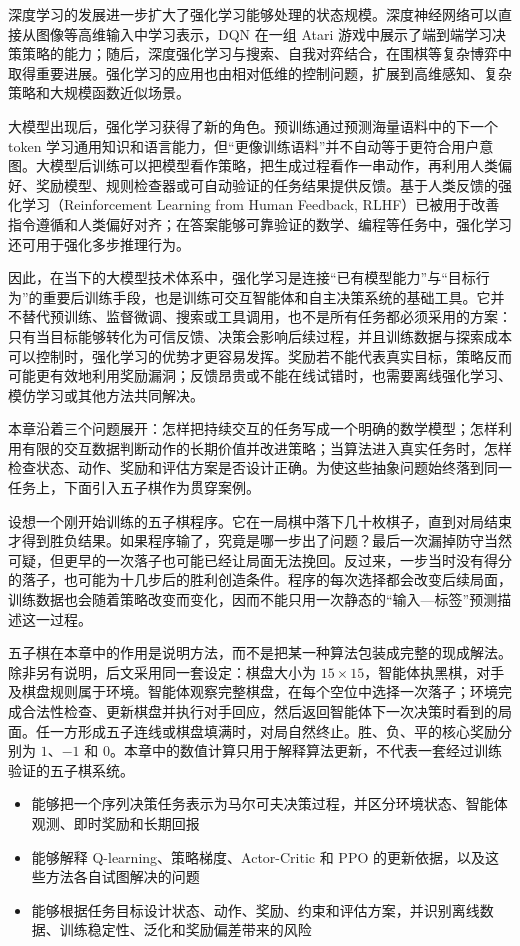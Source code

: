 \documentclass[UTF8,a4paper,zihao=-4,oneside,openany]{ctexbook}
\begin{document}
深度学习的发展进一步扩大了强化学习能够处理的状态规模。深度神经网络可以直接从图像等高维输入中学习表示，DQN 在一组 Atari 游戏中展示了端到端学习决策策略的能力；随后，深度强化学习与搜索、自我对弈结合，在围棋等复杂博弈中取得重要进展。强化学习的应用也由相对低维的控制问题，扩展到高维感知、复杂策略和大规模函数近似场景。

大模型出现后，强化学习获得了新的角色。预训练通过预测海量语料中的下一个 token 学习通用知识和语言能力，但“更像训练语料”并不自动等于更符合用户意图。大模型后训练可以把模型看作策略，把生成过程看作一串动作，再利用人类偏好、奖励模型、规则检查器或可自动验证的任务结果提供反馈。基于人类反馈的强化学习（Reinforcement Learning from Human Feedback, RLHF）已被用于改善指令遵循和人类偏好对齐；在答案能够可靠验证的数学、编程等任务中，强化学习还可用于强化多步推理行为。

因此，在当下的大模型技术体系中，强化学习是连接“已有模型能力”与“目标行为”的重要后训练手段，也是训练可交互智能体和自主决策系统的基础工具。它并不替代预训练、监督微调、搜索或工具调用，也不是所有任务都必须采用的方案：只有当目标能够转化为可信反馈、决策会影响后续过程，并且训练数据与探索成本可以控制时，强化学习的优势才更容易发挥。奖励若不能代表真实目标，策略反而可能更有效地利用奖励漏洞；反馈昂贵或不能在线试错时，也需要离线强化学习、模仿学习或其他方法共同解决。

本章沿着三个问题展开：怎样把持续交互的任务写成一个明确的数学模型；怎样利用有限的交互数据判断动作的长期价值并改进策略；当算法进入真实任务时，怎样检查状态、动作、奖励和评估方案是否设计正确。为使这些抽象问题始终落到同一任务上，下面引入五子棋作为贯穿案例。

设想一个刚开始训练的五子棋程序。它在一局棋中落下几十枚棋子，直到对局结束才得到胜负结果。如果程序输了，究竟是哪一步出了问题？最后一次漏掉防守当然可疑，但更早的一次落子也可能已经让局面无法挽回。反过来，一步当时没有得分的落子，也可能为十几步后的胜利创造条件。程序的每次选择都会改变后续局面，训练数据也会随着策略改变而变化，因而不能只用一次静态的“输入—标签”预测描述这一过程。

五子棋在本章中的作用是说明方法，而不是把某一种算法包装成完整的现成解法。除非另有说明，后文采用同一套设定：棋盘大小为 $15\times15$，智能体执黑棋，对手及棋盘规则属于环境。智能体观察完整棋盘，在每个空位中选择一次落子；环境完成合法性检查、更新棋盘并执行对手回应，然后返回智能体下一次决策时看到的局面。任一方形成五子连线或棋盘填满时，对局自然终止。胜、负、平的核心奖励分别为 $1$、$-1$ 和 $0$。本章中的数值计算只用于解释算法更新，不代表一套经过训练验证的五子棋系统。

\begin{learninggoals}
  \begin{itemize}
    \item 能够把一个序列决策任务表示为马尔可夫决策过程，并区分环境状态、智能体观测、即时奖励和长期回报
    \item 能够解释 Q-learning、策略梯度、Actor-Critic 和 PPO 的更新依据，以及这些方法各自试图解决的问题
    \item 能够根据任务目标设计状态、动作、奖励、约束和评估方案，并识别离线数据、训练稳定性、泛化和奖励偏差带来的风险
  \end{itemize}
\end{learninggoals}
\end{document}
